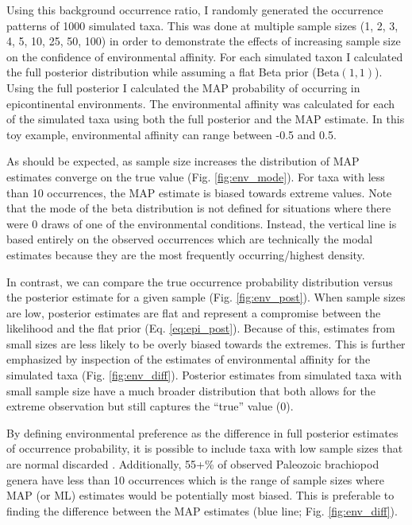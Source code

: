 \documentclass[12pt,letterpaper]{article}
\begin{document}
Using this background occurrence ratio, I randomly generated the occurrence patterns of 1000 simulated taxa. This was done at multiple sample sizes (1, 2, 3, 4, 5, 10, 25, 50, 100) in order to demonstrate the effects of increasing sample size on the confidence of environmental affinity. For each simulated taxon I calculated the full posterior distribution while assuming a flat Beta prior (\(\mathrm{Beta}(1, 1)\)). Using the full posterior I calculated the MAP probability of occurring in epicontinental environments. The environmental affinity was calculated for each of the simulated taxa using both the full posterior and the MAP estimate. In this toy example, environmental affinity can range between -0.5 and 0.5.

As should be expected, as sample size increases the distribution of MAP estimates converge on the true value (Fig. \ref{fig:env_mode}). For taxa with less than 10 occurrences, the MAP estimate is biased towards extreme values. Note that the mode of the beta distribution is not defined for situations where there were 0 draws of one of the environmental conditions. Instead, the vertical line is based entirely on the observed occurrences which are technically the modal estimates because they are the most frequently occurring/highest density.

In contrast, we can compare the true occurrence probability distribution versus the posterior estimate for a given sample (Fig. \ref{fig:env_post}). When sample sizes are low, posterior estimates are flat and represent a compromise between the likelihood and the flat prior (Eq. \ref{eq:epi_post}). Because of this, estimates from small sizes are less likely to be overly biased towards the extremes. This is further emphasized by inspection of the estimates of environmental affinity for the simulated taxa (Fig. \ref{fig:env_diff}). Posterior estimates from simulated taxa with small sample size have a much broader distribution that both allows for the extreme observation but still captures the ``true'' value (0). 


By defining environmental preference as the difference in full posterior estimates of occurrence probability, it is possible to include taxa with low sample sizes that are normal discarded \citep{Foote2006,Miller2001,Simpson2009,Kiessling2007a}. Additionally, 55+\% of observed Paleozoic brachiopod genera have less than 10 occurrences which is the range of sample sizes where MAP (or ML) estimates would be potentially most biased. This is preferable to finding the difference between the MAP estimates (blue line; Fig. \ref{fig:env_diff}).
\end{document}

